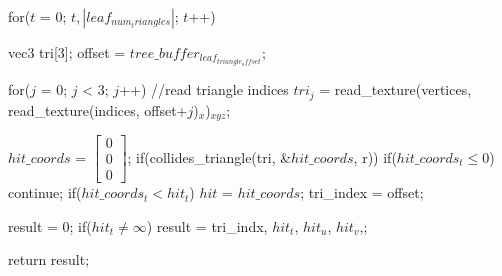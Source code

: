 \documentclass[12pt,letterpaper]{article}
\begin{document}
\begin{algorithm}[caption={Persistent Short Stack K-D Tree Traversal.}, label={alg1}]
{{{        for($t$ = 0; $t, |leaf_{num_triangles}|$; $t$++)
        {
          vec3 tri[3];
          offset =  $tree\_buffer_{leaf_{triangle_offset}}$;

          for($j$ = 0; $j$ < 3; $j$++) //read triangle indices
            $tri_j$ = read_texture(vertices, read_texture(indices, offset+$j$)$_x$)$_{xyz}$;

          $hit\_coords$ = $\begin{bmatrix} 0 \\ 0 \\ 0 \end{bmatrix}$;
          if(collides_triangle(tri, &$hit\_coords$, r))
          {
            if($hit\_coords_t \leq 0$)
              continue;
            if($hit\_coords_t < hit_t$)
            {
              $hit$ = $hit\_coords$;
              tri_index = offset;
            }
          }
        }
      }

      result = {0};
      if($hit_t \neq \infty$)
      {
        result = {tri_indx, $hit_t$, $hit_u$, $hit_v$,};
      }
     
      return result;
    }
  }
\end{algorithm}
\end{document}
